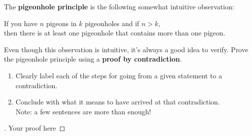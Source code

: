 \documentclass[12pt]{article}
\newenvironment{exercise}[2][Exercise]{\begin{trivlist}
\item[\hskip \labelsep {\bfseries #1}\hskip \labelsep {\bfseries #2.}]}{\end{trivlist}}
\newenvironment{solution}[1][{\color{red} Solution:}]{\begin{trivlist}
\item[\hskip \labelsep {\bfseries #1}\hskip \labelsep {\bfseries}]}{\end{trivlist}}
\begin{document}
\clearpage

\begin{exercise}{3}

    The \textbf{pigeonhole principle} is the following somewhat intuitive observation: 
    \begin{center}
    If you have $n$ pigeons in $k$ pigeonholes and if $n>k$,\\then there is at least one pigeonhole that contains more than one pigeon.
    \end{center}
    Even though this observation is intuitive, it's always a good idea to verify. Prove the pigeonhole principle using a \textbf{proof by contradiction}.

\begin{tip}
    \begin{enumerate}
        \item Clearly label each of the steps for going from a given statement to a contradiction.
        \item Conclude with what it means to have arrived at that contradiction.\\
        Note: a few sentences are more than enough!
    \end{enumerate}
    \end{tip}
        
\end{exercise}

\begin{solution} 
        \begin{proof}[\unskip\nopunct]
            Your proof here
        \end{proof}
    \end{solution}

\clearpage

\end{document}
